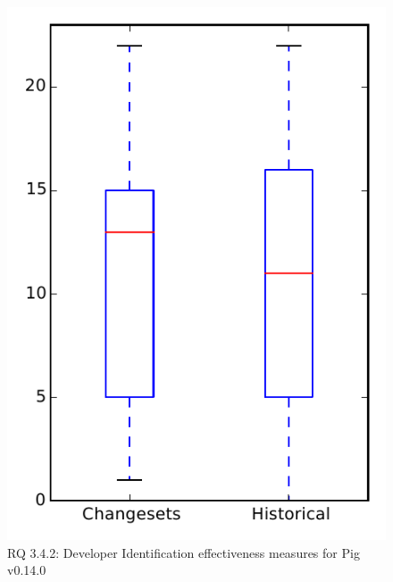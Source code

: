 
\begin{figure}
\centering
\includegraphics[height=0.4\textheight]{figures/dit/rq2_pig}
\caption{RQ 3.4.2: Developer Identification effectiveness measures for Pig v0.14.0}
\label{fig:dit:rq2:pig}
\end{figure}
